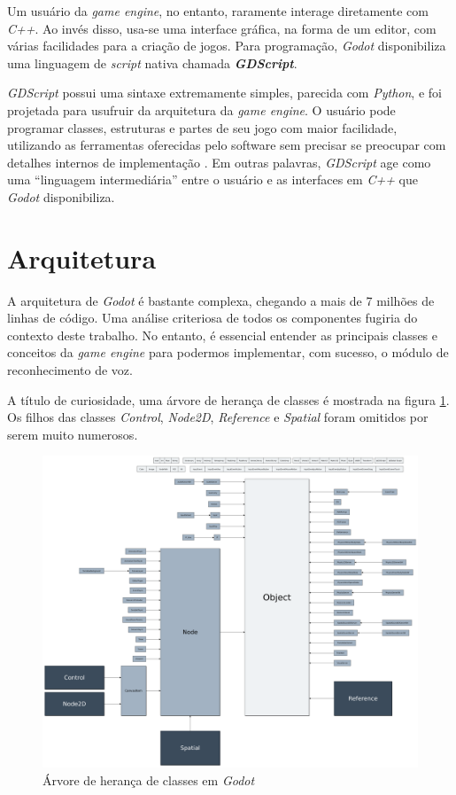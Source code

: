 Um usuário da \textit{game engine}, no entanto, raramente interage diretamente com \textit{C++}. Ao invés disso, usa-se uma interface gráfica, na forma de um editor, com várias facilidades para a criação de jogos. Para programação, \textit{Godot} disponibiliza uma linguagem de \textit{script} nativa chamada \mbox{\textbf{\textit{GDScript}}}.

\textit{GDScript} possui uma sintaxe extremamente simples, parecida com \textit{Python}, e foi projetada para usufruir da arquitetura da \textit{game engine}. O usuário pode programar classes, estruturas e partes de seu jogo com maior facilidade, utilizando as ferramentas oferecidas pelo software sem precisar se preocupar com detalhes internos de implementação \citep{godotGDScript}. Em outras palavras, \mbox{\textit{GDScript}} age como uma ``linguagem intermediária'' entre o usuário e as interfaces em \textit{C++} que \textit{Godot} disponibiliza.


\section{Arquitetura}

A arquitetura de \textit{Godot} é bastante complexa, chegando a mais de 7 milhões de linhas de código. Uma análise criteriosa de todos os componentes fugiria do contexto deste trabalho. No entanto, é essencial entender as principais classes e conceitos da \textit{game engine} para podermos implementar, com sucesso, o módulo de reconhecimento de voz.

A título de curiosidade, uma árvore de herança de classes é mostrada na figura \ref{godotClasses}. Os filhos das classes \textit{Control}, \textit{Node2D}, \textit{Reference} e \textit{Spatial} foram omitidos por serem muito numerosos.

\begin{figure}[H]
  \centering
  \includegraphics[width=\textwidth]{image/godot-classes.png}
  \caption{Árvore de herança de classes em \textit{Godot} \citep{godotClasses}}
  \label{godotClasses}
\end{figure}

